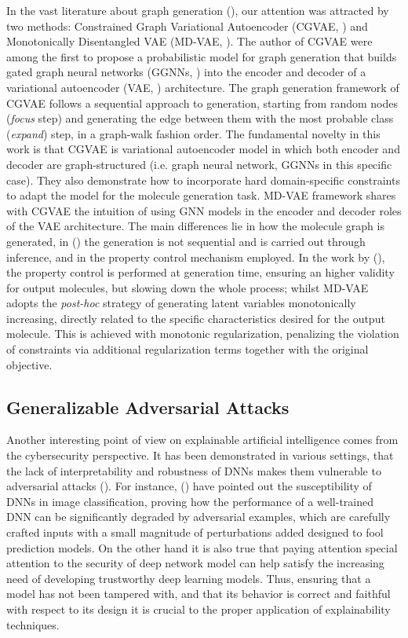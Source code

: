 \documentclass[binding=0.6cm]{sapthesis}
\newcommand{\mycite}[1]{(\cite{#1})}
\begin{document}
In the vast literature about graph generation \mycite{zhu2022-survey-generation}, our attention was attracted by two methods: Constrained Graph Variational Autoencoder (CGVAE, \cite{liu2019-cgvae}) and Monotonically Disentangled VAE (MD-VAE, \cite{du2022-mdvae}). The author of CGVAE were among the first to propose a probabilistic model for graph generation that builds gated graph neural networks (GGNNs, \cite{li2017-ggnn}) into the encoder and decoder of a variational autoencoder (VAE, \cite{Kingma2013-variational-bayes}) architecture. The graph generation framework of CGVAE follows a sequential approach to generation, starting from random nodes (\textit{focus} step) and generating the edge between them with the most probable class (\textit{expand}) step, in a graph-walk fashion order. The fundamental novelty in this work is that CGVAE is variational autoencoder model in which both encoder and decoder are graph-structured (i.e. graph neural network, GGNNs in this specific case). They also demonstrate how to incorporate hard domain-specific constraints to adapt the model for the molecule generation task. MD-VAE framework shares with CGVAE the intuition of using GNN models in the encoder and decoder roles of the VAE architecture. The main differences lie in how the molecule graph is generated, in (\cite{du2022-mdvae}) the generation is not sequential and is carried out through inference, and in the property control mechanism employed. In the work by (\cite{liu2019-cgvae}), the property control is performed at generation time, ensuring an higher validity for output molecules, but slowing down the whole process; whilst MD-VAE adopts the \textit{post-hoc} strategy of generating latent variables monotonically increasing, directly related to the specific characteristics desired for the output molecule. This is achieved with monotonic regularization, penalizing the violation of constraints via additional regularization terms together with the original objective.


\subsection{Generalizable Adversarial Attacks}
\label{sec:cfpg.bg.gaalv}
Another interesting point of view on explainable artificial intelligence comes from the cybersecurity perspective. It has been demonstrated in various settings, that the lack of interpretability and robustness of DNNs makes them vulnerable to adversarial attacks \mycite{sun2023-attack-defense}. For instance, \mycite{szegedy2014-intriguing} have pointed out the susceptibility of DNNs in image classification, proving how the performance of a well-trained DNN can be significantly degraded by adversarial examples, which are carefully crafted inputs with a small magnitude of perturbations added designed to fool prediction models. On the other hand it is also true that paying attention special attention to the security of deep network model can help satisfy the increasing need of developing trustworthy deep learning models. Thus, ensuring that a model has not been tampered with, and that its behavior is correct and faithful with respect to its design it is crucial to the proper application of explainability techniques.
\end{document}
